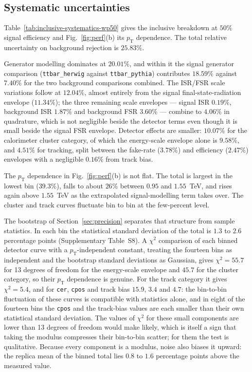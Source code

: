 \documentclass[pdflatex,sn-mathphys,Numbered,iicol]{sn-jnl}
\newcommand{\pt}{p_{\mathrm{T}}}
\begin{document}
\subsection{Systematic uncertainties}
\label{sec:systresults}

Table~\ref{tab:inclusive-systematics-wp50} gives the inclusive breakdown at $50\%$
signal efficiency and Fig.~\ref{fig:perf}(b) its $\pt$ dependence. The total relative
uncertainty on background rejection is $25.83\%$.

Generator modelling dominates at $20.01\%$, and within it the signal generator
comparison (\texttt{ttbar\_herwig} against \texttt{ttbar\_pythia}) contributes
$18.59\%$ against $7.40\%$ for the two background comparisons combined. The ISR/FSR
scale variations follow at $12.04\%$, almost entirely from the signal
final-state-radiation envelope ($11.34\%$); the three remaining scale envelopes ---
signal ISR $0.19\%$, background ISR $1.87\%$ and background FSR $3.60\%$ --- combine to
$4.06\%$ in quadrature, which is not negligible beside the detector terms even though
it is small beside the signal FSR envelope. Detector effects are smaller:
$10.07\%$ for the calorimeter cluster category, of which the energy-scale envelope
alone is $9.58\%$, and $4.51\%$ for tracking, split between the fake-rate
($3.78\%$) and efficiency ($2.47\%$) envelopes with a negligible $0.16\%$ from track
bias.

The $\pt$ dependence in Fig.~\ref{fig:perf}(b) is not flat. The total is largest in the
lowest bin ($39.3\%$), falls to about $26\%$ between $0.95$ and $1.55$~TeV, and rises
again above $1.55$~TeV as the extrapolated signal-modelling term takes over. The
cluster and track curves fluctuate bin to bin at the few-percent level.

The bootstrap of Section~\ref{sec:precision} separates that structure from sample
statistics. In each bin the statistical standard deviation of the total is $1.3$ to
$2.6$ percentage points (Supplementary Table~S8). A $\chi^2$ comparison of each binned
detector curve with a $\pt$-independent constant, treating the fourteen bins as
independent and the bootstrap standard deviations as Gaussian, gives
$\chi^2 = 55.7$ for 13 degrees of freedom for the energy-scale envelope and $45.7$ for
the cluster category, so their $\pt$ dependence is genuine. For the track category it
gives $\chi^2 = 5.4$, and for \texttt{cer}, \texttt{cpos} and track bias $15.9$, $3.4$
and $4.7$: the bin-to-bin fluctuation of these curves is compatible with statistics
alone, and in eight of the fourteen bins the \texttt{cpos} and the track-bias values are
each smaller than their own statistical standard deviation. The values of $\chi^2$ for
these small components are lower than 13 degrees of freedom would make likely, which
is itself a sign that taking the modulus compresses their bin-to-bin scatter; for them
the test is qualitative. Because every component is a
modulus, noise also biases it upward: the replica mean of the binned total lies $0.8$ to
$1.6$ percentage points above the measured value.
\end{document}
